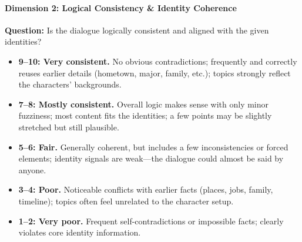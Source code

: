 \paragraph{Dimension 2: Logical Consistency \& Identity Coherence}
\textbf{Question:} Is the dialogue logically consistent and aligned with the given identities?
\begin{itemize}
  \item \textbf{9--10: Very consistent.}
  No obvious contradictions;
  frequently and correctly reuses earlier details (hometown, major, family, etc.);
  topics strongly reflect the characters' backgrounds.

  \item \textbf{7--8: Mostly consistent.}
  Overall logic makes sense with only minor fuzziness;
  most content fits the identities;
  a few points may be slightly stretched but still plausible.

  \item \textbf{5--6: Fair.}
  Generally coherent, but includes a few inconsistencies or forced elements;
  identity signals are weak---the dialogue could almost be said by anyone.

  \item \textbf{3--4: Poor.}
  Noticeable conflicts with earlier facts (places, jobs, family, timeline);
  topics often feel unrelated to the character setup.

  \item \textbf{1--2: Very poor.}
  Frequent self-contradictions or impossible facts;
  clearly violates core identity information.
\end{itemize}

